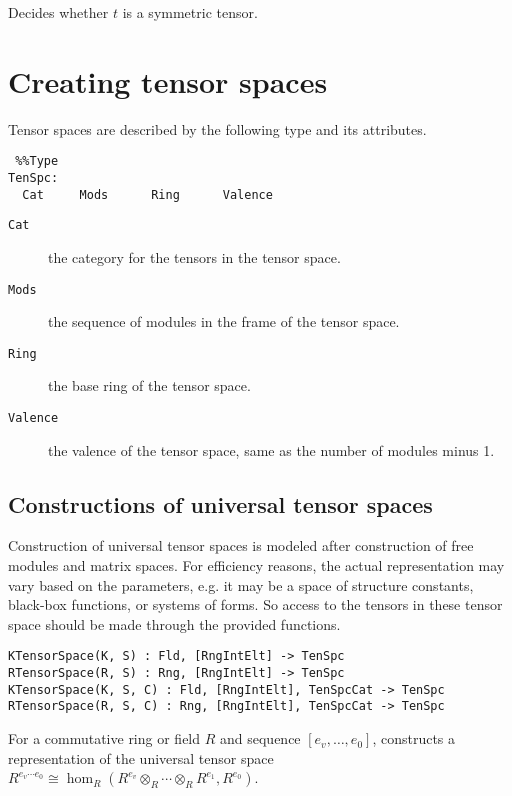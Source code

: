 \documentclass{amsart}
\begin{document}
Decides whether $t$ is a symmetric tensor.



\section{Creating tensor spaces}

Tensor spaces are described by the following type and its attributes.

\color{blue}
{\small \begin{verbatim} %%Type
TenSpc:
  Cat     Mods      Ring      Valence
\end{verbatim} }
\color{black}

\begin{description}
\item[{\tt Cat}] the category for the tensors in the tensor space.
\item[{\tt Mods}] the sequence of modules in the frame of the tensor space. 
\item[{\tt Ring}] the base ring of the tensor space. 
\item[{\tt Valence}] the valence of the tensor space, same as the number of 
modules minus 1. 
\end{description}


\subsection{Constructions of universal tensor spaces}

Construction of universal tensor spaces is modeled after construction of free 
modules and matrix spaces. For efficiency reasons, the actual representation may 
vary based on the parameters, e.g. it may be a space of structure constants, 
black-box functions, or systems of forms. So access to the tensors in these 
tensor space should be made through the provided functions.

\color{blue}
{\small \begin{verbatim}
KTensorSpace(K, S) : Fld, [RngIntElt] -> TenSpc
RTensorSpace(R, S) : Rng, [RngIntElt] -> TenSpc
KTensorSpace(K, S, C) : Fld, [RngIntElt], TenSpcCat -> TenSpc
RTensorSpace(R, S, C) : Rng, [RngIntElt], TenSpcCat -> TenSpc
\end{verbatim} }
\color{black}

For a commutative ring or field $R$ and sequence $[e_v,\dots,e_0]$, constructs a 
representation of the universal tensor space 
$R^{e_v\cdots e_0}\cong \hom_R(R^{e_v}\otimes_R\cdots \otimes_R R^{e_1}, 
R^{e_0})$.
\end{document}
